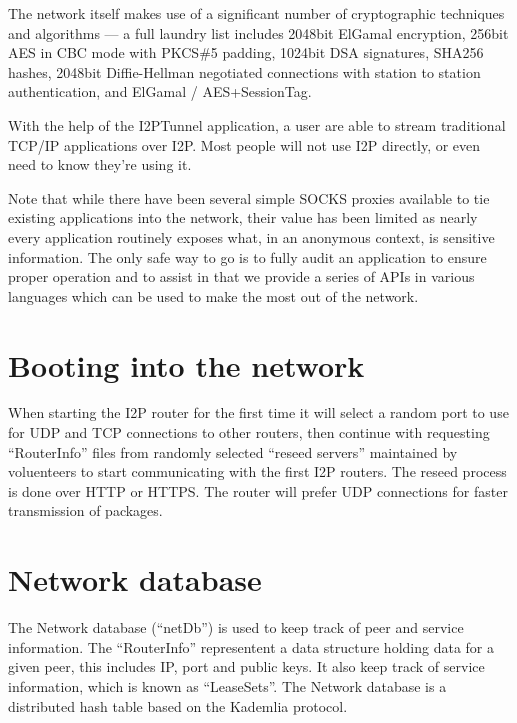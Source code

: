 \documentclass[a4paper,twocolumn,12pt]{article}
\begin{document}
The network itself makes use of a significant number of cryptographic techniques and
algorithms --- a full laundry list includes 2048bit ElGamal\cite{DBLP:journals/tit/Elgamal85}
encryption, 256bit AES\cite{books/sp/DaemenR02} in CBC mode with PKCS\#5 padding, 1024bit 
DSA\cite{2000--dss} signatures, SHA256 hashes, 2048bit Diffie-Hellman negotiated connections with 
station to station authentication, and ElGamal / AES+SessionTag.

\vspace{2 em}

With the help of the I2PTunnel application, a user are able to stream
traditional TCP/IP\cite{rfc793} applications over I2P. Most people will not use I2P
directly, or even need to know they're using it.

Note that while there have been several simple SOCKS proxies available to tie
existing applications into the network, their value has been limited as nearly
every application routinely exposes what, in an anonymous context, is sensitive
information. The only safe way to go is to fully audit an application to ensure
proper operation and to assist in that we provide a series of APIs in various
languages which can be used to make the most out of the network.

\section{Booting into the network}

When starting the I2P router for the first time it will select a random port to use for UDP\cite{rfc768}
and TCP connections to other routers, then continue with requesting ``RouterInfo'' files
from randomly selected ``reseed servers'' maintained by voluenteers to start communicating
with the first I2P routers. The reseed process is done over HTTP or HTTPS. The router will prefer
UDP connections for faster transmission of packages.

\section{Network database}

The Network database (``netDb'') is used to keep track of peer and service
information. The ``RouterInfo'' representent a data structure holding data for a
given peer, this includes IP, port and public keys. It also keep track of
service information, which is known as ``LeaseSets''. The Network database is a
distributed hash table based on the Kademlia\cite{Maymounkov:2002:KPI:646334.687801} protocol.
\end{document}
